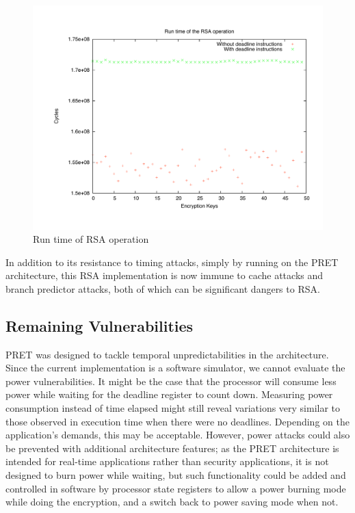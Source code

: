 \documentclass[times, 10pt,twocolumn]{article}
\begin{document}
\begin{figure}[ht]
  \centering
  \includegraphics[scale=.3]{./images/RSA.pdf}
  \caption{Run time of RSA operation}
  \label{fig:rsa}
\end{figure}

In addition to its resistance to timing attacks, simply by running on the PRET architecture, this RSA implementation is now immune to cache attacks and branch predictor attacks, both of which can be significant dangers to RSA\cite{branchpredict, Percival05cachemissing}.

\subsection{Remaining Vulnerabilities}
PRET was designed to tackle temporal unpredictabilities in the architecture. Since the current implementation is a software simulator, we cannot evaluate the power vulnerabilities. It might be the case that the processor will consume less power while waiting for the deadline register to count down. Measuring power consumption instead of time elapsed might still reveal variations very similar to those observed in execution time when there were no deadlines.  Depending on the application's demands, this may be acceptable.  However, power attacks could also be prevented with additional architecture features; as the PRET architecture is intended for real-time applications rather than security applications, it is not designed to burn power while waiting, but such functionality could be added and controlled in software by processor state registers to allow a power burning mode while doing the encryption, and a switch back to power saving mode when not.  
\end{document}
